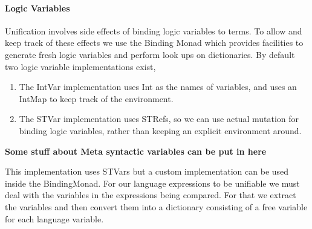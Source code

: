 \documentclass[thesis-solanki.tex]{subfiles}
\begin{document}
\paragraph{Logic Variables}
Unification involves side effects of binding logic variables to terms. To allow and keep track of these effects we use the Binding Monad
which provides facilities to generate fresh logic variables and perform look ups on dictionaries. By default two logic variable
implementations exist,

\begin{enumerate}
\item The IntVar implementation uses Int as the names of variables, and uses an
IntMap to keep track of the environment.

\item The STVar implementation uses STRefs, so we can use actual mutation for binding logic variables,
rather than keeping an explicit environment around.

\end{enumerate}

\textbf{Some stuff about Meta syntactic variables can be put in here}

This implementation uses STVars but a custom implementation can be used inside the BindingMonad.
For our language expressions to be unifiable we must deal with the variables in the expressions being compared. For that we extract the
variables and then convert them into a dictionary consisting of a free variable for each language variable.
\end{document}
